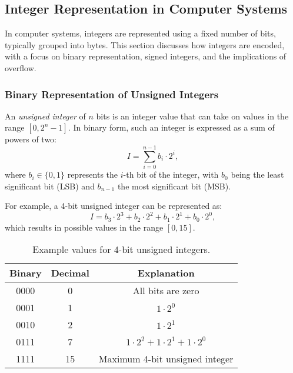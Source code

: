 
\subsection{Integer Representation in Computer Systems}

In computer systems, integers are represented using a fixed number of bits, typically grouped into bytes. This section discusses how integers are encoded, with a focus on binary representation, signed integers, and the implications of overflow.

\subsubsection{Binary Representation of Unsigned Integers}

An \emph{unsigned integer} of $n$ bits is an integer value that can take on values in the range $[0, 2^n - 1]$. In binary form, such an integer is expressed as a sum of powers of two:
\[
I = \sum_{i=0}^{n-1} b_i \cdot 2^i,
\]
where $b_i \in \{0, 1\}$ represents the $i$-th bit of the integer, with $b_0$ being the least significant bit (LSB) and $b_{n-1}$ the most significant bit (MSB).

For example, a 4-bit unsigned integer can be represented as:
\[
I = b_3 \cdot 2^3 + b_2 \cdot 2^2 + b_1 \cdot 2^1 + b_0 \cdot 2^0,
\]
which results in possible values in the range $[0, 15]$.

\begin{table}[h]
	\centering
	\begin{tabular}{|c|c|c|}
		\hline
		\textbf{Binary} & \textbf{Decimal} & \textbf{Explanation} \\ \hline
		0000            & 0                & All bits are zero           \\ \hline
		0001            & 1                & $1 \cdot 2^0$               \\ \hline
		0010            & 2                & $1 \cdot 2^1$               \\ \hline
		0111            & 7                & $1 \cdot 2^2 + 1 \cdot 2^1 + 1 \cdot 2^0$  \\ \hline
		1111            & 15               & Maximum 4-bit unsigned integer              \\ \hline
	\end{tabular}
	\caption{Example values for 4-bit unsigned integers.}
\end{table}


